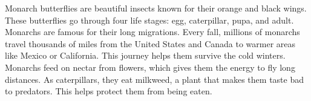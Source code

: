 \documentclass[12pt]{article}
\begin{document}
\vspace{1em}
\begin{tcolorbox}[colframe=black!60, colback=white, 
coltitle=black, colbacktitle=black!15, fonttitle=\bfseries\Large, 
title=Source 2: Monarch Butterflies, halign title=center, left=10pt, right=10pt, top=10pt, bottom=15pt]
Monarch butterflies are beautiful insects known for their orange and black wings. These butterflies go through four life stages: egg, caterpillar, pupa, and adult. Monarchs are famous for their long migrations. Every fall, millions of monarchs travel thousands of miles from the United States and Canada to warmer areas like Mexico or California. This journey helps them survive the cold winters. Monarchs feed on nectar from flowers, which gives them the energy to fly long distances. As caterpillars, they eat milkweed, a plant that makes them taste bad to predators. This helps protect them from being eaten. 
 

 



     \end{tcolorbox}
\end{document}
